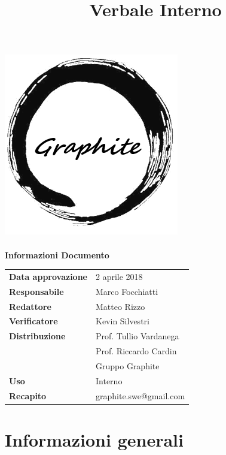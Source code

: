 \documentclass[openany,12pt,a4paper]{article}
\title{Verbale Interno}
\author{}
\begin{document}
 
  \makeatletter 
  \begin{titlepage} 
    \setlength{\headsep}{0pt}   
    \begin{center} 
      \includegraphics[width=0.5\linewidth]{Logo.png}\\[1em] 
      {\huge \bfseries  \@title }\\[10ex] 
      \textbf{\Large Informazioni Documento} \\[2em] 
      \bgroup 
      \def\arraystretch{1.5} 
      \begin{tabular}{l|l} 
        \textbf{Data approvazione} & 2 aprile 2018 \\ 
        \textbf{Responsabile} & Marco Focchiatti \\ 
        \textbf{Redattore} & Matteo Rizzo \\ 
        \textbf{Verificatore} & Kevin Silvestri \\ 
        \textbf{Distribuzione} & Prof. Tullio Vardanega \\ 
         & Prof. Riccardo Cardin \\ 
         & Gruppo Graphite \\ 
        \textbf{Uso} & Interno \\ 
        \textbf{Recapito} & graphite.swe@gmail.com \\ 
      \end{tabular} 
    \egroup 
    \end{center} 
  \end{titlepage} 
  \makeatother 
 
  \thispagestyle{empty} 
  \newpage 
   
  \tableofcontents 
  \newpage 
   
  \section{Informazioni generali} 
   
\end{document}
